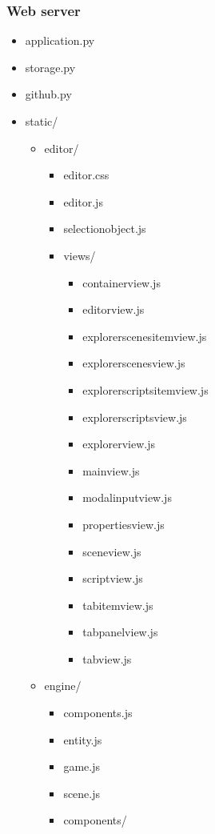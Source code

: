 \subsubsection{Web server}
\begin{itemize}
	\itemsep-0.6em
	\item application.py
	\item storage.py
	\item github.py
	\item static/
	\begin{itemize}
		\itemsep-0.6em
		\item editor/
		\begin{itemize}
			\itemsep-0.6em
			\item editor.css
			\item editor.js
			\item selectionobject.js
			\item views/
			\begin{itemize}
				\itemsep-0.6em
				\item containerview.js
				\item editorview.js
				\item explorerscenesitemview.js
				\item explorerscenesview.js
				\item explorerscriptsitemview.js
				\item explorerscriptsview.js
				\item explorerview.js
				\item mainview.js
				\item modalinputview.js
				\item propertiesview.js
				\item sceneview.js
				\item scriptview.js
				\item tabitemview.js
				\item tabpanelview.js
				\item tabview.js
			\end{itemize}
		\end{itemize}
		\item engine/
		\begin{itemize}
			\itemsep-0.6em
			\item components.js
			\item entity.js
			\item game.js
			\item scene.js
			\item components/
			\begin{itemize}

\end{itemize}
\end{itemize}
\end{itemize}
\end{itemize}
